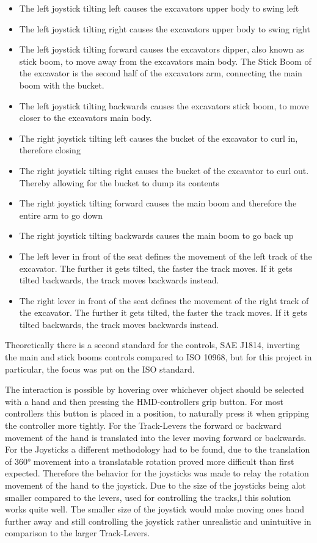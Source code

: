 \documentclass[journal]{vgtc}                     %
\begin{document}
\begin{itemize}
  \item The left joystick tilting left causes the excavators upper body to swing left
  \item The left joystick tilting right causes the excavators upper body to swing right
  \item The left joystick tilting forward causes the excavators dipper, also known as stick boom, to move away from the excavators main body.
           The Stick Boom of the excavator is the second half of the excavators arm, connecting the main boom with the bucket.
  \item The left joystick tilting backwards causes the excavators stick boom, to move closer to the excavators main body.
  \item The right joystick tilting left causes the bucket of the excavator to curl in, therefore closing
  \item The right joystick tilting right causes the bucket of the excavator to curl out. Thereby allowing for the bucket to dump its contents
  \item The right joystick tilting forward causes the main boom and therefore the entire arm to go down
  \item The right joystick tilting backwards causes the main boom to go back up 
  \item The left lever in front of the seat defines the movement of the left track of the excavator. The further it gets tilted, the faster the track moves. If it gets tilted backwards, the track moves backwards instead.
  \item The right lever in front of the seat defines the movement of the right track of the excavator. The further it gets tilted, the faster the track moves. If it gets tilted backwards, the track moves backwards instead.
\end{itemize}

Theoretically there is a second standard for the controls, SAE J1814, inverting the main and stick booms controls compared to ISO 10968, but for this project in particular, the focus was put on the ISO standard.

The interaction is possible by hovering over whichever object should be selected with a hand and then pressing the HMD-controllers grip button. For most controllers this button is placed in a position, to naturally press it when gripping the controller more tightly. For the Track-Levers the forward or backward movement of the hand is translated into the lever moving forward or backwards. For the Joysticks a different methodology had to be found, due to the translation of 360° movement into a translatable rotation proved more difficult than first expected. Therefore the behavior for the joysticks was made to relay the rotation movement of the hand to the joystick. Due to the size of the joysticks being alot smaller compared to the levers, used for controlling the tracks,l this solution works quite well. The smaller size of the joystick would make moving ones hand further away and still controlling the joystick rather unrealistic and unintuitive in comparison to the larger Track-Levers.
\end{document}
